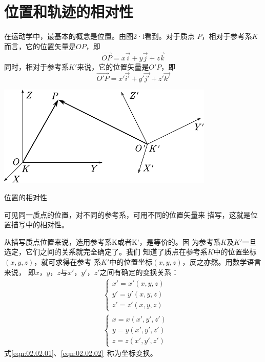 \section{位置和轨迹的相对性}\label{sec:02.02}
在运动学中，最基本的概念是位置。由图2·l看到。对于质点
$P$，相对于参考系$K$而言，它的位置矢量是$OP$，即
\begin{equation*}
    \vec{OP}=x\vec{i}+y\vec{j}+z\vec{k}
\end{equation*}
同时，相对于参考系$K'$来说，它的位置矢量是$O'P$，即
\begin{equation*}
    \vec{O'P}=x'\vec{i'}+y'\vec{j'}+z'\vec{k'}
\end{equation*}
\begin{figurex}
    \centering
    \includegraphics{figure/fig02.01}
    \caption{位置的相对性}
    \label{fig:02.01}
\end{figurex}

可见同一质点的位置，对不同的参考系，可用不同的位置矢量来
描写，这就是位置描写中的相对性。

从描写质点位置来说，选用参考系K或者K'，是等价的。因
为参考系$K$及$K'$一旦选定，它们之间的关系就完全确定了。我们
知道了质点在参考系$K$中的位置坐标$(x,y,z)$，就可求得在参考
系$K'$中的位置坐标$(x,y,z)$，反之亦然。用数学语言来说，
即$x$，$y$，$z$与$x'$，$y'$，$z'$之间有确定的变换关系：
\begin{align}
    \label{eqn:02.02.01}
    &\left\{\begin{array}{l}
        x'=x'(x, y, z) \\
        y'=y'(x, y, z) \\
        z'=z'(x, y, z)
    \end{array}\right. \\
    \label{eqn:02.02.02}
    &\left\{\begin{array}{l}
    x=x(x', y', z') \\
    y=y(x', y', z') \\
    z=z(x', y', z')
    \end{array}\right.
\end{align}
式\eqref{eqn:02.02.01}、\eqref{eqn:02.02.02}~称为坐标变换。

